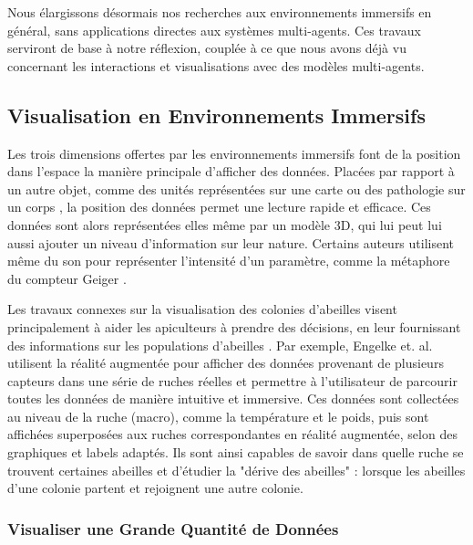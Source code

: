 	Nous élargissons désormais nos recherches aux environnements immersifs en général, sans applications directes aux systèmes multi-agents. Ces travaux serviront de base à notre réflexion, couplée à ce que nous avons déjà vu concernant les interactions et visualisations avec des modèles multi-agents.
	
	\subsection{Visualisation en Environnements Immersifs}
	
	Les trois dimensions offertes par les environnements immersifs font de la position dans l'espace la manière principale d'afficher des données. Placées par rapport à un autre objet, comme des unités représentées sur une carte \cite{durbin_battlefield_1998} ou des pathologie sur un corps \cite{coffey_interactive_2012}, la position des données permet une lecture rapide et efficace. Ces données sont alors représentées elles même par un modèle 3D, qui lui peut lui aussi ajouter un niveau d'information sur leur nature. Certains auteurs utilisent même du son pour représenter l'intensité d'un paramètre, comme la métaphore du compteur Geiger \cite{frohlich_exploring_1999}.
	
	
		
		Les travaux connexes sur la visualisation des colonies d'abeilles visent principalement à aider les apiculteurs à prendre des décisions, en leur fournissant des informations sur les populations d'abeilles \cite{engelke_visual_2016, engelke_melissar_2016, nguyen_augmented_2017}. Par exemple, Engelke et. al. \cite{engelke_visual_2016} utilisent la réalité augmentée pour afficher des données provenant de plusieurs capteurs dans une série de ruches réelles et permettre à l'utilisateur de parcourir toutes les données de manière intuitive et immersive. Ces données sont collectées au niveau de la ruche (macro), comme la température et le poids, puis sont affichées superposées aux ruches correspondantes en réalité augmentée, selon des graphiques et labels adaptés. Ils sont ainsi capables de savoir dans quelle ruche se trouvent certaines abeilles et d'étudier la "dérive des abeilles" : lorsque les abeilles d'une colonie partent et rejoignent une autre colonie.
	
	\subsubsection{Visualiser une Grande Quantité de Données}
	
